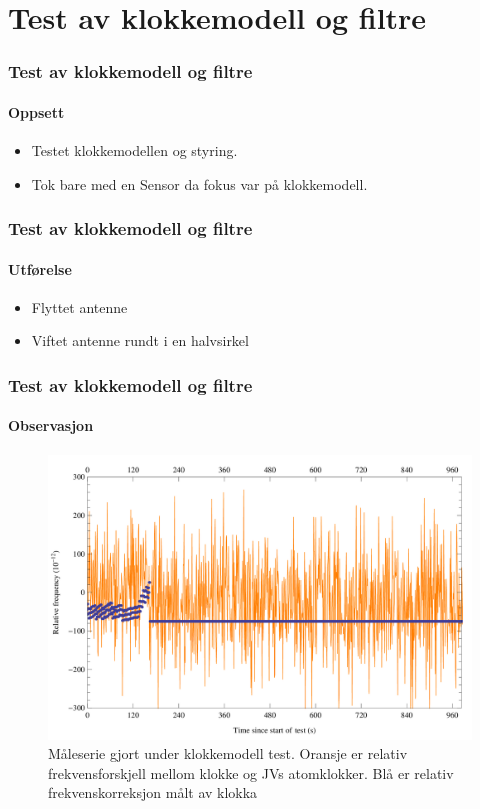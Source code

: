 \documentclass[xcolor=table]{beamer}
\begin{document}
\section{Test av klokkemodell og filtre}
\begin{frame}
\frametitle{Test av klokkemodell og filtre}
\framesubtitle{Oppsett}
  \begin{itemize}
        \setlength\itemsep{2em}
    \item Testet klokkemodellen og styring.
    \item Tok bare med en Sensor da fokus var på klokkemodell. 
  \end{itemize}
\end{frame}

\begin{frame}
\frametitle{Test av klokkemodell og filtre}
\framesubtitle{Utførelse}
      \begin{itemize}
            \setlength\itemsep{2em}
        \item Flyttet antenne 
        \item Viftet antenne rundt i en halvsirkel
      \end{itemize}
\end{frame}

\begin{frame}
\frametitle{Test av klokkemodell og filtre}
\framesubtitle{Observasjon}
      \begin{figure}
        \includegraphics[scale=0.18]{thesis/graphics/20161024-test2-telemetry-and-cnt91-combined-1-3.png}
        \caption{Måleserie gjort under klokkemodell test. Oransje er relativ frekvensforskjell mellom klokke og JVs atomklokker. Blå er relativ frekvenskorreksjon målt av klokka}
      \end{figure}
\end{frame}
\end{document}
